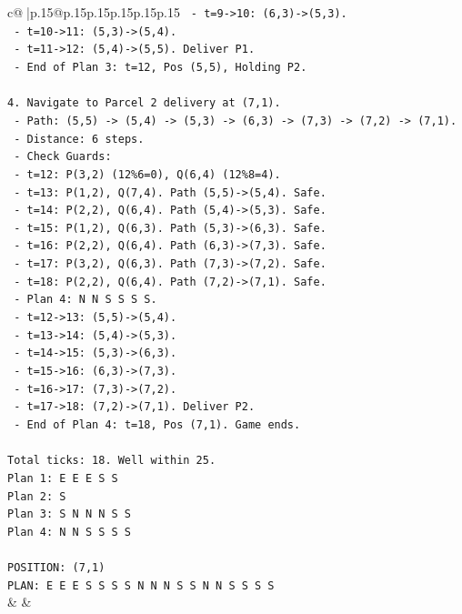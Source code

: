 \documentclass{article}
\begin{document}
{\begin{supertabular}{c@{$\;$}|p{.15\linewidth}@{}p{.15\linewidth}p{.15\linewidth}p{.15\linewidth}p{.15\linewidth}p{.15\linewidth}}
{{{\texttt{     {-} t=9{-}>10: (6,3){-}>(5,3).} \\
\texttt{     {-} t=10{-}>11: (5,3){-}>(5,4).} \\
\texttt{     {-} t=11{-}>12: (5,4){-}>(5,5). Deliver P1.} \\
\texttt{   {-} End of Plan 3: t=12, Pos (5,5), Holding P2.} \\
\\ 
\texttt{4. Navigate to Parcel 2 delivery at (7,1).} \\
\texttt{   {-} Path: (5,5) {-}> (5,4) {-}> (5,3) {-}> (6,3) {-}> (7,3) {-}> (7,2) {-}> (7,1).} \\
\texttt{   {-} Distance: 6 steps.} \\
\texttt{   {-} Check Guards:} \\
\texttt{     {-} t=12: P(3,2) (12\%6=0), Q(6,4) (12\%8=4).} \\
\texttt{     {-} t=13: P(1,2), Q(7,4). Path (5,5){-}>(5,4). Safe.} \\
\texttt{     {-} t=14: P(2,2), Q(6,4). Path (5,4){-}>(5,3). Safe.} \\
\texttt{     {-} t=15: P(1,2), Q(6,3). Path (5,3){-}>(6,3). Safe.} \\
\texttt{     {-} t=16: P(2,2), Q(6,4). Path (6,3){-}>(7,3). Safe.} \\
\texttt{     {-} t=17: P(3,2), Q(6,3). Path (7,3){-}>(7,2). Safe.} \\
\texttt{     {-} t=18: P(2,2), Q(6,4). Path (7,2){-}>(7,1). Safe.} \\
\texttt{   {-} Plan 4: N N S S S S.} \\
\texttt{     {-} t=12{-}>13: (5,5){-}>(5,4).} \\
\texttt{     {-} t=13{-}>14: (5,4){-}>(5,3).} \\
\texttt{     {-} t=14{-}>15: (5,3){-}>(6,3).} \\
\texttt{     {-} t=15{-}>16: (6,3){-}>(7,3).} \\
\texttt{     {-} t=16{-}>17: (7,3){-}>(7,2).} \\
\texttt{     {-} t=17{-}>18: (7,2){-}>(7,1). Deliver P2.} \\
\texttt{   {-} End of Plan 4: t=18, Pos (7,1). Game ends.} \\
\\ 
\texttt{Total ticks: 18. Well within 25.} \\
\texttt{Plan 1: E E E S S} \\
\texttt{Plan 2: S} \\
\texttt{Plan 3: S N N N S S} \\
\texttt{Plan 4: N N S S S S} \\
\\ 
\texttt{POSITION: (7,1)} \\
\texttt{PLAN: E E E S S S S N N N S S N N S S S S} \\
            }
        }
    }
    & & \\ \\


\end{supertabular}}
\end{document}
